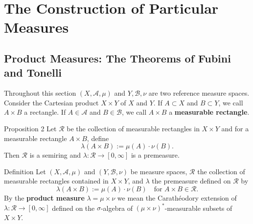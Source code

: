 \chapter{The Construction of Particular Measures}

\section{Product Measures: The Theorems of Fubini and Tonelli}

Throughout this section $(X,\mathcal{A},\mu)$ and $Y,\mathcal{B},\nu$ are two reference measure spaces.
Consider the Cartesian product $X\times Y$ of $X$ and $Y$.
If $A\subset X$ and $B\subset Y$, we call $A\times B$ a rectangle.
If $A\in\mathcal{A}$ and $B\in\mathcal{B}$, we call $A\times B$ a \textbf{measurable rectangle}.

\begin{namedthm*}{Proposition 2}
    Let $\mathcal{R}$ be the collection of measurable rectangles in $X\times Y$ and for a measurable rectangle $A\times B$, define
    \[
        \lambda(A\times B):=\mu(A)\cdot\nu(B).
    \]
    Then $\mathcal{R}$ is a semiring and $\lambda:\mathcal{R}\to[0,\infty]$ is a premeasure.
\end{namedthm*}

\begin{namedthm*}{Definition}
    Let $(X,\mathcal{A},\mu)$ and $(Y,\mathcal{B},\nu)$ be measure spaces, $\mathcal{R}$ the collection of measurable rectangles contained in $X\times Y$, and $\lambda$ the premeasure defined on $\mathcal{R}$ by
    \[
        \lambda(A\times B):=\mu(A)\cdot\nu(B)\quad\text{for }A\times B\in\mathcal{R}.
    \]
    By the \textbf{product measure} $\lambda=\mu\times\nu$ we mean the Carath\'eodory extension of $\lambda:\mathcal{R}\to[0,\infty]$ defined on the $\sigma$-algebra of $(\mu\times\nu)^*$-measurable subsets of $X\times Y$.
\end{namedthm*}

